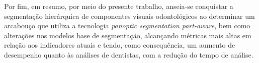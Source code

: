 Por fim, em resumo, por meio do presente trabalho, anseia-se conquistar a segmentação hierárquica de componentes visuais odontológicos ao determinar um arcabouço que utiliza a tecnologia \textit{panoptic segmentation part-aware}, bem como alterações nos modelos base de segmentação, alcançando métricas mais altas em relação aos indicadores atuais e tendo, como consequência, um aumento de desempenho quanto às análises de dentistas, com a redução do tempo de análise.
